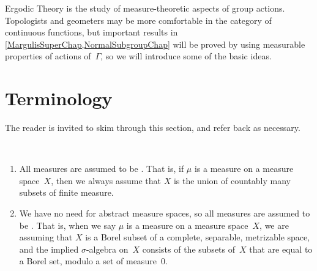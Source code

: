 
 \label{ErgodicChap}


Ergodic Theory is the study of measure-theoretic aspects of group actions. 
Topologists and geometers may be more comfortable in the category of continuous functions, but important results in \cref{MargulisSuperChap,NormalSubgroupChap} will be proved by using measurable properties of actions of~$\Gamma$, so we will introduce some of the basic ideas. 

\section{Terminology}

The reader is invited to skim through this section, and refer back as necessary.

\begin{assump} \ 
\noprelistbreak
\begin{enumerate}
\item All measures are assumed to be . That is, if $\mu$ is a measure on a measure space~$X$, then we always assume that $X$ is the union of countably many subsets of finite measure.
\item We have no need for abstract measure spaces, so all measures are assumed to be \defit[measure!Borel]{Borel}. That is, when we say $\mu$ is a measure on a measure space~$X$, we are assuming that $X$ is a Borel subset of a complete, separable, metrizable space, and the implied $\sigma$-algebra on~$X$ consists of the subsets of~$X$ that are equal to a Borel set, modulo a set of measure~$0$.
\end{enumerate}
\end{assump}

